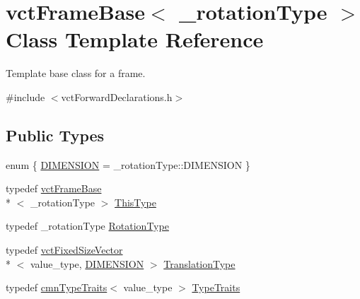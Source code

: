 \hypertarget{classvct_frame_base}{\section{vct\-Frame\-Base$<$ \-\_\-rotation\-Type $>$ Class Template Reference}
\label{classvct_frame_base}
}


Template base class for a frame.  




{\ttfamily \#include $<$vct\-Forward\-Declarations.\-h$>$}

\subsection*{Public Types}
\begin{DoxyCompactItemize}
\item 
enum \{ \hyperlink{classvct_frame_base_a4284a4e875533c13df90a20c0233e043ad25b85efd5e4c2687ddf38ae18cd88f0}{D\-I\-M\-E\-N\-S\-I\-O\-N} = \-\_\-rotation\-Type\-:\-:D\-I\-M\-E\-N\-S\-I\-O\-N
 \}
\item 
typedef \hyperlink{classvct_frame_base}{vct\-Frame\-Base}\\*
$<$ \-\_\-rotation\-Type $>$ \hyperlink{classvct_frame_base_a076f1fe4fc957faa0d1ff7450d1cb768}{This\-Type}
\item 
typedef \-\_\-rotation\-Type \hyperlink{classvct_frame_base_a02e4eaad478400dd1d81e772caf3b01b}{Rotation\-Type}
\item 
typedef \hyperlink{classvct_fixed_size_vector}{vct\-Fixed\-Size\-Vector}\\*
$<$ value\-\_\-type, \hyperlink{classvct_frame_base_a4284a4e875533c13df90a20c0233e043ad25b85efd5e4c2687ddf38ae18cd88f0}{D\-I\-M\-E\-N\-S\-I\-O\-N} $>$ \hyperlink{classvct_frame_base_a4c397a93b65f0c38e75e99ff3a659c23}{Translation\-Type}
\item 
typedef \hyperlink{classcmn_type_traits}{cmn\-Type\-Traits}$<$ value\-\_\-type $>$ \hyperlink{classvct_frame_base_adfad078285c2712e6acd80fcbfbf5dec}{Type\-Traits}
\end{DoxyCompactItemize}

